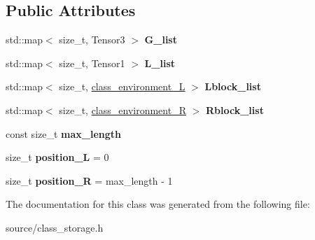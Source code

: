 \subsection*{Public Attributes}
\begin{DoxyCompactItemize}
\item 
std\+::map$<$ size\+\_\+t, Tensor3 $>$ {\bfseries G\+\_\+list}\hypertarget{classclass__storage_ad04719c0e94ace7121efce3b095d62b4}{}\label{classclass__storage_ad04719c0e94ace7121efce3b095d62b4}

\item 
std\+::map$<$ size\+\_\+t, Tensor1 $>$ {\bfseries L\+\_\+list}\hypertarget{classclass__storage_a3e0c27eb0be5e2d52e8a3712402deb8c}{}\label{classclass__storage_a3e0c27eb0be5e2d52e8a3712402deb8c}

\item 
std\+::map$<$ size\+\_\+t, \hyperlink{classclass__environment___l}{class\+\_\+environment\+\_\+L} $>$ {\bfseries Lblock\+\_\+list}\hypertarget{classclass__storage_af4efcc2daa54c5c63cacb55ea536eaff}{}\label{classclass__storage_af4efcc2daa54c5c63cacb55ea536eaff}

\item 
std\+::map$<$ size\+\_\+t, \hyperlink{classclass__environment___r}{class\+\_\+environment\+\_\+R} $>$ {\bfseries Rblock\+\_\+list}\hypertarget{classclass__storage_afb6bd35c054846e09e4173888e8e8660}{}\label{classclass__storage_afb6bd35c054846e09e4173888e8e8660}

\item 
const size\+\_\+t {\bfseries max\+\_\+length}\hypertarget{classclass__storage_ac880f674d440d41f7ee8dbaca8dc0664}{}\label{classclass__storage_ac880f674d440d41f7ee8dbaca8dc0664}

\item 
size\+\_\+t {\bfseries position\+\_\+L} = 0\hypertarget{classclass__storage_a879c8de38832fe2d87ff59cc3bfcbd63}{}\label{classclass__storage_a879c8de38832fe2d87ff59cc3bfcbd63}

\item 
size\+\_\+t {\bfseries position\+\_\+R} = max\+\_\+length -\/ 1\hypertarget{classclass__storage_a3044ee359d62e78406f89242faa305e9}{}\label{classclass__storage_a3044ee359d62e78406f89242faa305e9}

\end{DoxyCompactItemize}


The documentation for this class was generated from the following file\+:\begin{DoxyCompactItemize}
\item 
source/class\+\_\+storage.\+h\end{DoxyCompactItemize}

